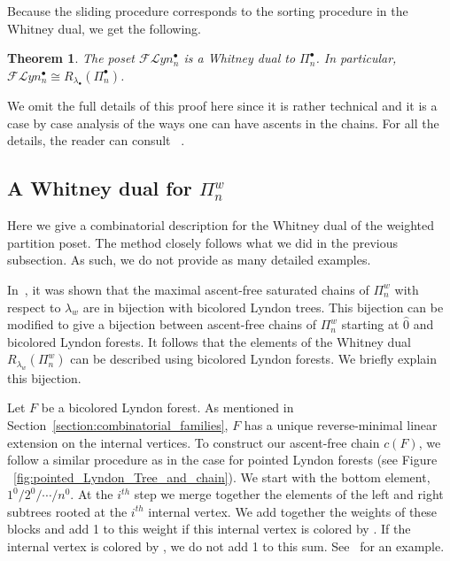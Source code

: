 \documentclass[11pt]{article}
\newtheorem{theo}{Theorem}[section]
\theoremstyle{definition}
\numberwithin{equation}{section}
\newcommand{\Flyn}{\mathcal{FL}yn}
\newcommand{\tre}[1]{{\color{red}{#1}}}
\newcommand{\tbl}[1]{{\color{blue}{#1}}}
\begin{document}
Because the sliding procedure corresponds to the sorting procedure in the Whitney dual, we get the following.




\begin{theo} \label{theorem:whitney_dual_pointed} \label{theorem:flynpointed_dual} The poset $\Flyn_{n}^{\bullet}$ is a Whitney dual to $\Pi_n^\bullet$. In particular, $\Flyn_{n}^{\bullet}\cong R_{\lambda_\bullet}(\Pi_n^\bullet)$.
\end{theo}

We omit the full details of this proof here since it is rather technical and it is  a case by case analysis of the ways one can have ascents in the chains.     For all the details, the reader can consult ~\cite[Section 3.2.2]{QuicenoDuran2020}.

   
   
    
\subsection{A Whitney dual for \texorpdfstring{$\Pi_n^w$}-}\label{section:WhitneyDualOfWeighted}  Here we give a combinatorial description for the Whitney dual of the weighted partition poset.  The method closely follows what we did in the previous subsection. As such, we do not provide as many detailed examples.




In~\cite[Theorem 5.7]{GonzalezDleonWachs2016}, it was shown that the maximal ascent-free saturated chains of $\Pi_n^w$   with respect to $\lambda_w$ are in bijection with bicolored Lyndon trees.   This bijection can be modified  to give a bijection between ascent-free chains of $\Pi_n^w$ starting at $\hat{0}$ and bicolored Lyndon forests.  It follows that the elements of the Whitney dual $R_{\lambda_w}(\Pi_n^w)$ can be described using bicolored Lyndon forests.    We briefly explain this bijection.



Let $F$ be a bicolored Lyndon forest. As mentioned in Section~\ref{section:combinatorial_families},  $F$ has a unique reverse-minimal linear extension on the internal vertices.  To construct our ascent-free chain $c(F)$, we follow a similar procedure as in the case for pointed Lyndon forests (see Figure ~\ref{fig:pointed_Lyndon_Tree_and_chain}). We start with the   bottom element, $1^0/2^0/\cdots /n^0$.  At the $i^{th}$ step we merge together the elements of the left and right subtrees rooted at the $i^{th}$ internal vertex. We add together the weights of these blocks and add 1 to this weight if this internal vertex is colored by \tre{1}. If the internal vertex is colored by \tbl{0}, we do not add 1 to this sum. See~\cite[Figure 4]{GonzalezDleonWachs2016} for an example. 
\end{document}

